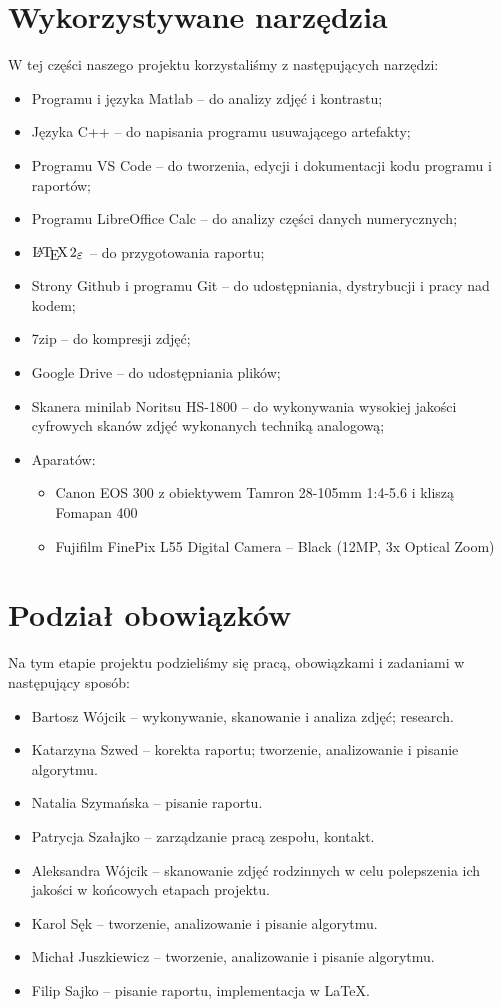 \documentclass[]{mwart}
\begin{document}
\section{Wykorzystywane narzędzia}
W tej części naszego projektu korzystaliśmy z następujących narzędzi:
\begin{itemize}
    \item Programu i języka Matlab -- do analizy zdjęć i kontrastu;
    \item Języka C++ -- do napisania programu usuwającego artefakty;
    \item Programu VS Code -- do tworzenia, edycji i dokumentacji kodu programu i raportów;
    \item Programu LibreOffice Calc -- do analizy części danych numerycznych;
    \item $\LaTeXe{}$ -- do przygotowania raportu;
    \item Strony Github i programu Git -- do udostępniania, dystrybucji i pracy nad kodem;
    \item 7zip -- do kompresji zdjęć;
    \item Google Drive -- do udostępniania plików;
    \item Skanera minilab Noritsu HS-1800 -- do wykonywania wysokiej jakości cyfrowych skanów zdjęć wykonanych techniką analogową;
    \item Aparatów:
          \begin{itemize}
              \item Canon EOS 300 z obiektywem Tamron 28-105mm 1:4-5.6 i kliszą Fomapan 400
              \item Fujifilm FinePix L55 Digital Camera -- Black (12MP, 3x Optical Zoom)
          \end{itemize}
\end{itemize}


\section{Podział obowiązków}
Na tym etapie projektu podzieliśmy się pracą, obowiązkami i zadaniami w następujący sposób:
\begin{itemize}
    \item Bartosz Wójcik -- wykonywanie, skanowanie i analiza zdjęć; research.
    \item Katarzyna Szwed -- korekta raportu; tworzenie, analizowanie i pisanie algorytmu.
    \item Natalia Szymańska -- pisanie raportu.
    \item Patrycja Szałajko -- zarządzanie pracą zespołu, kontakt.
    \item Aleksandra Wójcik -- skanowanie zdjęć rodzinnych w celu polepszenia ich jakości w końcowych etapach projektu.
    \item Karol Sęk -- tworzenie, analizowanie i pisanie algorytmu.
    \item Michał Juszkiewicz -- tworzenie, analizowanie i pisanie algorytmu.
    \item Filip Sajko -- pisanie raportu, implementacja w \LaTeX{}.
\end{itemize}
\end{document}
